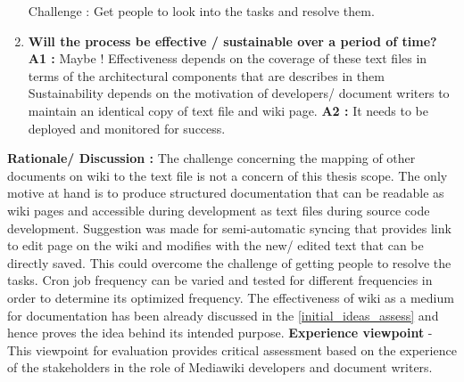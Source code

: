 \begin{enumerate}
Challenge : Get people to look into the tasks and resolve them.
\item \textbf{Will the process be effective / sustainable over a period of time?}
\newline \textbf{A1 :} Maybe ! 
\newline Effectiveness depends on the coverage of these text files in terms of the architectural components that are describes in them
\newline Sustainability depends on the motivation of developers/ document writers to maintain an identical copy of text file and wiki page.
\newline \textbf{A2 :} It needs to be deployed and monitored for success.
\end{enumerate}
\textbf{Rationale/ Discussion : } The challenge concerning the mapping of other documents on wiki to the text file is not a concern of this thesis scope. The only motive at hand is to produce structured documentation that can be readable as wiki pages and accessible during development as text files during source code development.
\newline \newline Suggestion was made for semi-automatic syncing that provides link to edit page on the wiki and modifies with the new/ edited text that can be directly saved. This could overcome the challenge of getting people to resolve the tasks.
\newline \newline
Cron job frequency can be varied and tested for different frequencies in order to determine its optimized frequency.
\newline \newline
The effectiveness of wiki as a medium for documentation has been already discussed in the \autoref{initial_ideas_assess} and hence proves the idea behind its intended purpose. 
\newline
\newline
\textbf{Experience viewpoint} - This viewpoint for evaluation provides critical assessment based on the experience of the stakeholders in the role of Mediawiki developers and document writers. 
